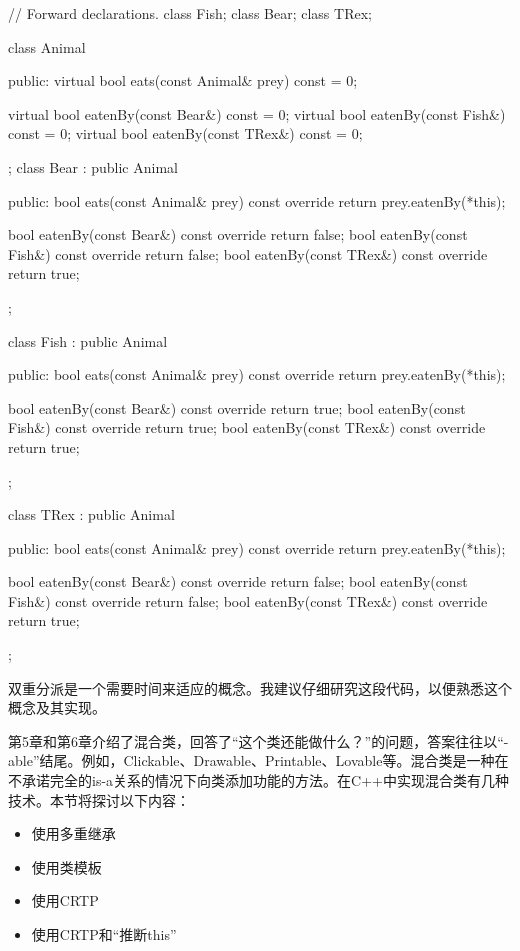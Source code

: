 \begin{cpp}
// Forward declarations.
class Fish;
class Bear;
class TRex;

class Animal
{
    public:
        virtual bool eats(const Animal& prey) const = 0;

        virtual bool eatenBy(const Bear&) const = 0;
        virtual bool eatenBy(const Fish&) const = 0;
        virtual bool eatenBy(const TRex&) const = 0;
};
class Bear : public Animal
{
    public:
        bool eats(const Animal& prey) const override{ return prey.eatenBy(*this); }

        bool eatenBy(const Bear&) const override { return false; }
        bool eatenBy(const Fish&) const override { return false; }
        bool eatenBy(const TRex&) const override { return true; }
};

class Fish : public Animal
{
    public:
        bool eats(const Animal& prey) const override{ return prey.eatenBy(*this); }

        bool eatenBy(const Bear&) const override { return true; }
        bool eatenBy(const Fish&) const override { return true; }
        bool eatenBy(const TRex&) const override { return true; }
};

class TRex : public Animal
{
    public:
        bool eats(const Animal& prey) const override{ return prey.eatenBy(*this); }

        bool eatenBy(const Bear&) const override { return false; }
        bool eatenBy(const Fish&) const override { return false; }
        bool eatenBy(const TRex&) const override { return true; }
};
\end{cpp}

双重分派是一个需要时间来适应的概念。我建议仔细研究这段代码，以便熟悉这个概念及其实现。


第5章和第6章介绍了混合类，回答了“这个类还能做什么？”的问题，答案往往以“-able”结尾。例如，Clickable、Drawable、Printable、Lovable等。混合类是一种在不承诺完全的is-a关系的情况下向类添加功能的方法。在C++中实现混合类有几种技术。本节将探讨以下内容：

\begin{itemize}
\item
使用多重继承

\item
使用类模板

\item
使用CRTP

\item
使用CRTP和“推断this”
\end{itemize}

